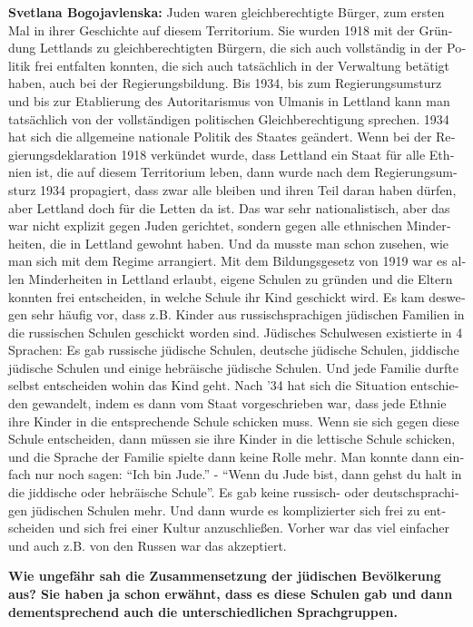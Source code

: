 \begin{otherlanguage}{ngerman}
\textbf{Svetlana Bogojavlenska:} Juden waren gleichberechtigte Bürger, zum ersten Mal in ihrer Geschichte auf diesem Territorium. Sie wurden 1918 mit der Gründung Lettlands zu gleichberechtigten Bürgern, die sich auch vollständig in der Politik frei entfalten konnten, die sich auch tatsächlich in der Verwaltung betätigt haben, auch bei der Regierungsbildung. Bis 1934, bis zum Regierungsumsturz und bis zur Etablierung des Autoritarismus von Ulmanis in Lettland kann man tatsächlich von der vollständigen politischen Gleichberechtigung sprechen.
1934 hat sich die allgemeine nationale Politik des Staates geändert. Wenn bei der Regierungsdeklaration 1918 verkündet wurde, dass Lettland ein Staat für alle Ethnien ist, die auf diesem Territorium leben, dann wurde nach dem Regierungsumsturz 1934 propagiert, dass zwar alle bleiben und ihren Teil daran haben dürfen, aber Lettland doch für die Letten da ist. Das war sehr nationalistisch, aber das war nicht explizit gegen Juden gerichtet, sondern gegen alle ethnischen Minderheiten, die in Lettland gewohnt haben. Und da musste man schon zusehen, wie man sich mit dem Regime arrangiert.
Mit dem Bildungsgesetz von 1919 war es allen Minderheiten in Lettland erlaubt, eigene Schulen zu gründen und die Eltern konnten frei entscheiden, in welche Schule ihr Kind geschickt wird. Es kam deswegen sehr häufig vor, dass z.B. Kinder aus russischsprachigen jüdischen Familien in die russischen Schulen geschickt worden sind. Jüdisches Schulwesen existierte in 4 Sprachen: Es gab russische jüdische Schulen, deutsche jüdische Schulen, jiddische jüdische Schulen und einige hebräische jüdische Schulen. Und jede Familie durfte selbst entscheiden wohin das Kind geht. Nach '34 hat sich die Situation entschieden gewandelt, indem es dann vom Staat vorgeschrieben war, dass jede Ethnie ihre Kinder in die entsprechende Schule schicken muss. Wenn sie sich gegen diese Schule entscheiden, dann müssen sie ihre Kinder in die lettische Schule schicken, und die Sprache der Familie spielte dann keine Rolle mehr. Man konnte dann einfach nur noch sagen: "`Ich bin Jude."' - "`Wenn du Jude bist, dann gehst du halt in die jiddische oder hebräische Schule"'. Es gab keine russisch- oder deutschsprachigen jüdischen Schulen mehr. Und dann wurde es komplizierter sich frei zu entscheiden und sich frei einer Kultur anzuschließen. Vorher war das viel einfacher und auch z.B. von den Russen war das akzeptiert.

\textbf{Wie ungefähr sah die Zusammensetzung der jüdischen Bevölkerung aus? Sie haben ja schon erwähnt, dass es diese Schulen gab und dann dementsprechend auch die unterschiedlichen Sprachgruppen.}


\end{otherlanguage}
